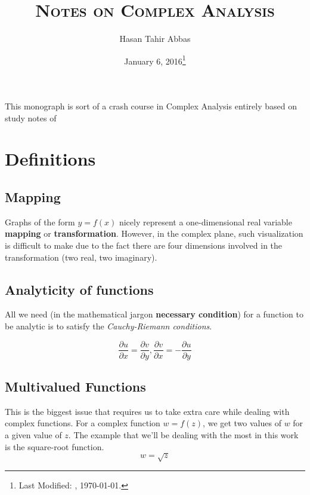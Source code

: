 \documentclass[letterpaper,11pt]{article}
\begin{document}
\title{\textsc{Notes on Complex Analysis}\\}
\author{Hasan Tahir Abbas}
\date{January 6, 2016\footnote{Last Modified: \currenttime, \today.}}
\maketitle
This monograph is sort of a crash course in Complex Analysis entirely based on study notes of \cite{ablowitz2003complex}
\section*{\textbf{Definitions}} %




\subsection*{Mapping}

Graphs of the form $y = f(x)$ nicely represent a one-dimensional real variable \textbf{mapping} or \textbf{transformation}. However, in the complex plane, such visualization is difficult to make due to the fact there are four dimensions involved in the transformation (two real, two imaginary). 

\subsection*{Analyticity of functions} 

All we need (in the mathematical jargon \textbf{necessary condition}) for a function to be analytic is to satisfy the \emph{Cauchy-Riemann conditions}.

\begin{equation}
\frac{\partial u}{\partial x} = \frac{\partial v}{\partial y}, \frac{\partial v}{\partial x} = - \frac{\partial u}{\partial y}
\end{equation}

\subsection*{Multivalued Functions} 

This is the biggest issue that requires us to take extra care while dealing with complex functions. For a complex function $w = f(z)$, we get two values of $w$ for a given value of $z$. The example that we'll be dealing with the most in this work is the square-root function.
$$
w = \sqrt{z}
$$
\end{document}
